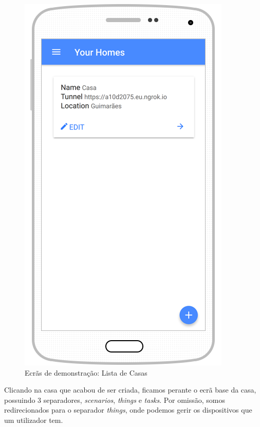 \begin{figure}[H]
  \centering
        \includegraphics[scale=0.6]{img/demo/list_home.png}
  \caption{Ecrãs de demonstração: Lista de Casas}
\end{figure}

Clicando na casa que acabou de ser criada, ficamos perante o ecrã base da casa, possuindo 3 separadores, \textit{scenarios}, \textit{things} e \textit{tasks}. Por omissão, somos redirecionados para o separador \textit{things}, onde podemos gerir os dispositivos que um utilizador tem.

